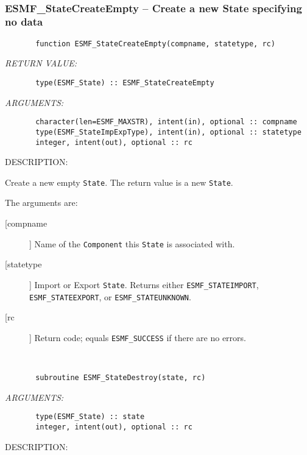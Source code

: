  
\mbox{}\hrulefill\ 
 
\subsubsection{ESMF\_StateCreateEmpty -- Create a new State specifying no data}


 
\begin{verbatim}       function ESMF_StateCreateEmpty(compname, statetype, rc)\end{verbatim}{\em RETURN VALUE:}
\begin{verbatim}       type(ESMF_State) :: ESMF_StateCreateEmpty\end{verbatim}{\em ARGUMENTS:}
\begin{verbatim}       character(len=ESMF_MAXSTR), intent(in), optional :: compname 
       type(ESMF_StateImpExpType), intent(in), optional :: statetype
       integer, intent(out), optional :: rc \end{verbatim}
{\sf DESCRIPTION:\\ }


    Create a new empty {\tt State}.  The return value is a new {\tt State}.
      
    The arguments are:
    \begin{description}
  
     \item[[compname]]
      Name of the {\tt Component} this {\tt State} is associated with.
  
     \item[[statetype]]
      Import or Export {\tt State}.  Returns either {\tt ESMF\_STATEIMPORT},
      {\tt ESMF\_STATEEXPORT}, or {\tt ESMF\_STATEUNKNOWN}.
  
     \item[[rc]]
      Return code; equals {\tt ESMF\_SUCCESS} if there are no errors.
  
     \end{description}
   
 
\mbox{}\hrulefill\ 
 

\begin{verbatim}       subroutine ESMF_StateDestroy(state, rc)\end{verbatim}{\em ARGUMENTS:}
\begin{verbatim}       type(ESMF_State) :: state
       integer, intent(out), optional :: rc\end{verbatim}
{\sf DESCRIPTION:\\ }


